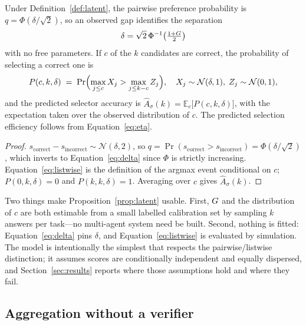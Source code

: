 \begin{proposition}
\label{prop:latent}
Under Definition~\ref{def:latent}, the pairwise preference probability is
$q = \Phi(\delta/\sqrt{2})$, so an observed gap identifies the separation
\begin{equation}
\delta = \sqrt{2}\,\Phi^{-1}\!\left(\tfrac{1+G}{2}\right)
\label{eq:delta}
\end{equation}
with no free parameters. If $c$ of the $k$ candidates are correct, the
probability of selecting a correct one is
\begin{equation}
P(c,k,\delta) \;=\; \Pr\Bigl(\max_{j\le c} X_j > \max_{j \le k-c} Z_j\Bigr),
\quad X_j \sim \mathcal{N}(\delta,1),\; Z_j \sim \mathcal{N}(0,1),
\label{eq:listwise}
\end{equation}
and the predicted selector accuracy is
$\hat{A}_\sigma(k) = \mathbb{E}_{c}\bigl[P(c,k,\delta)\bigr]$, with the
expectation taken over the observed distribution of $c$. The predicted
selection efficiency follows from Equation~\eqref{eq:eta}.
\end{proposition}

\begin{proof}
$s_{\text{correct}} - s_{\text{incorrect}} \sim \mathcal{N}(\delta, 2)$, so
$q = \Pr(s_{\text{correct}} > s_{\text{incorrect}}) = \Phi(\delta/\sqrt{2})$,
which inverts to Equation~\eqref{eq:delta} since $\Phi$ is strictly increasing.
Equation~\eqref{eq:listwise} is the definition of the argmax event conditional
on $c$; $P(0,k,\delta)=0$ and $P(k,k,\delta)=1$. Averaging over $c$ gives
$\hat{A}_\sigma(k)$.
\end{proof}

Two things make Proposition~\ref{prop:latent} usable. First, $G$ and the
distribution of $c$ are both estimable from a small labelled calibration set by
sampling $k$ answers per task---no multi-agent system need be built. Second,
nothing is fitted: Equation~\eqref{eq:delta} pins $\delta$, and
Equation~\eqref{eq:listwise} is evaluated by simulation. The model is
intentionally the simplest that respects the pairwise/listwise distinction; it
assumes scores are conditionally independent and equally dispersed, and
Section~\ref{sec:results} reports where those assumptions hold and where they
fail.

\subsection{Aggregation without a verifier}

